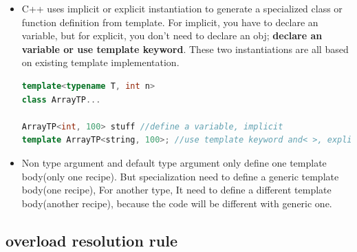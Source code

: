 \documentclass[a4paper,11pt,twoside]{book}
\begin{document}
\begin{itemize}
   
	\item C++ uses implicit or explicit instantiation to generate a specialized class or function definition from template. For implicit, you have to declare an variable, but for explicit, you don't need to declare an obj; \textbf{declare an variable or use template keyword}. These two instantiations are all based on existing template implementation.
	
\begin{lstlisting}[frame=single, language=c++]
template<typename T, int n>
class ArrayTP...
	
ArrayTP<int, 100> stuff //define a variable, implicit	
template ArrayTP<string, 100>; //use template keyword and< >, explicit
\end{lstlisting}

	\item Non type argument and default type argument only define one template body(only one recipe). But specialization need to define a generic template body(one recipe), For another type, It need to define a different template body(another recipe), because the code will be different with generic one.
	 
%	 
%
%


	 
	
\end{itemize}

\subsection{overload resolution rule}
\end{document}
